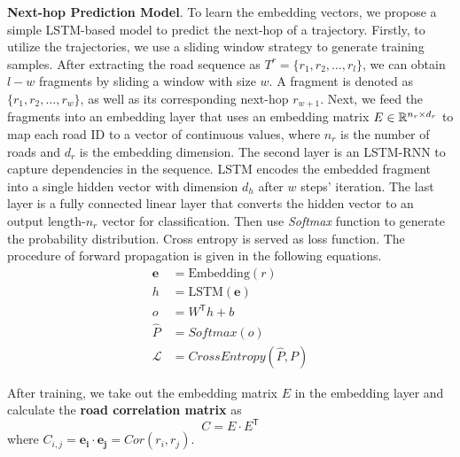 \textbf{Next-hop Prediction Model}. To learn the embedding vectors, we propose a simple LSTM\cite{LSTM}-based model to predict the next-hop of a trajectory. Firstly, to utilize the trajectories, we use a sliding window strategy to generate training samples. After extracting the road sequence as $T^r=\{r_1, r_2, \dots, r_l \}$, we can obtain $l-w$ fragments by sliding a window with size $w$. A fragment is denoted as $\{r_1, r_2, \dots, r_w\}$, as well as its corresponding next-hop $r_{w+1}$. Next, we feed the fragments into an embedding layer that uses an embedding matrix $E\in\mathbb{R}^{n_r\times d_r}$ to map each road ID to a vector of continuous values, where $n_r$ is the number of roads and $d_r$ is the embedding dimension. The second layer is an LSTM-RNN to capture dependencies in the sequence. LSTM encodes the embedded fragment into a single hidden vector with dimension $d_h$ after $w$ steps' iteration. The last layer is a fully connected linear layer that converts the hidden vector to an output length-$n_r$ vector for classification. Then use \textit{Softmax} function to generate the probability distribution. Cross entropy is served as loss function. The procedure of forward propagation is given in the following equations.
\begin{equation}
    \begin{aligned}
        \mathbf{e}&=\mathrm{Embedding}(r)\\
        h&=\mathrm{LSTM}(\mathbf{e})\\
        o&=W^\mathsf{T}h+b\\
        \hat P&=Softmax(o)\\
        \mathcal{L}&=CrossEntropy(\hat P, P)
    \end{aligned}
\end{equation}

After training, we take out the embedding matrix $E$ in the embedding layer and calculate the \textbf{road correlation matrix} as
\begin{equation}
    C=E\cdot E^\mathsf{T}
\end{equation}
where $C_{i, j}=\mathbf{e_i}\cdot \mathbf{e_j}=Cor(r_i, r_j)$.

